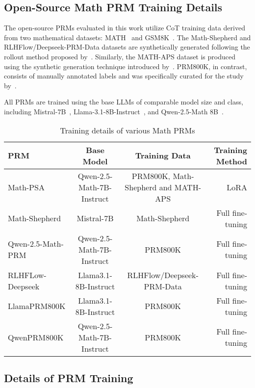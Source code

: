 \subsection{Open-Source Math PRM Training Details}
\label{sec:open-mathprm}


The open-source PRMs evaluated in this work utilize CoT training data derived from two mathematical datasets:
MATH~\citep{hendrycks2measuring} and GSM8K~\citep{cobbe2021training}.
The Math-Shepherd and RLHFlow/Deepseek-PRM-Data datasets are synthetically generated following the rollout method proposed by~\citet{wang2024math}.
Similarly, the MATH-APS dataset is produced using the synthetic generation technique introduced by~\citet{luo2024improve}. PRM800K, in contrast, consists of manually annotated labels and was specifically curated for the study by~\citet{lightman2023let}.


All PRMs are trained using the base LLMs of comparable model size and class,
including Mistral-7B~\citep{jiang2023mistral},
Llama-3.1-8B-Instruct~\citep{dubey2024llama},
and Qwen-2.5-Math 8B~\citep{yang2024qwen2}.


\begin{table*}[ht]
    \centering
    \caption{Training details of various Math PRMs}
    \resizebox{\linewidth}{!}
    {
    \begin{tabular}{lccr}
    \toprule
    \textbf{PRM} & \textbf{Base Model} & \textbf{Training Data} & \textbf{Training Method} \\
    \midrule
    Math-PSA & Qwen-2.5-Math-7B-Instruct & PRM800K, Math-Shepherd and MATH-APS & LoRA \\
    Math-Shepherd & Mistral-7B & Math-Shepherd & Full fine-tuning \\
    Qwen-2.5-Math-PRM & Qwen-2.5-Math-7B-Instruct & PRM800K & Full fine-tuning \\
    RLHFLow-Deepseek & Llama3.1-8B-Instruct & RLHFlow/Deepseek-PRM-Data & Full fine-tuning \\
    \midrule
    LlamaPRM800K & Llama3.1-8B-Instruct & PRM800K & Full fine-tuning \\
    QwenPRM800K & Qwen-2.5-Math-7B-Instruct & PRM800K & Full fine-tuning \\
    \bottomrule
    \end{tabular}
    }
    \label{tab:math_prm_details}
\end{table*}


\subsection{Details of PRM Training}
\label{sec:prm-train}




